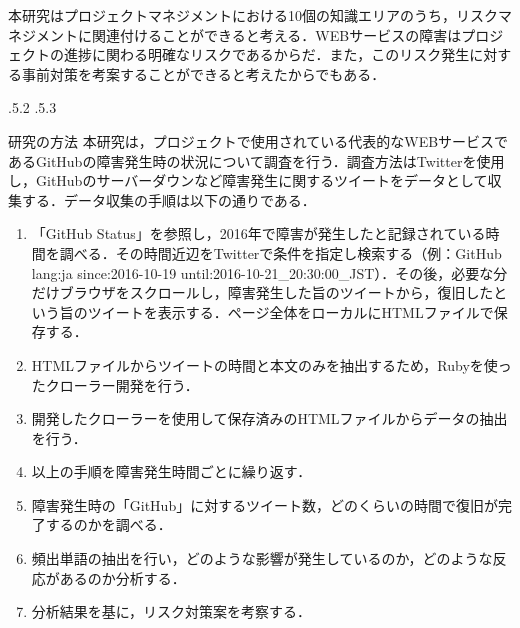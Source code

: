 \documentclass[uplatex]{jsarticle}
\makeatletter
\renewcommand{\section}{%
    \if@slide\clearpage\fi
    \@startsection{section}{1}{\z@}%
    {\Cvs \@plus.5\Cdp \@minus.2\Cdp}%
    {.5\Cvs \@plus.3\Cdp}%
    {\normalfont\raggedright}}
\makeatother
\begin{document}
本研究はプロジェクトマネジメントにおける10個の知識エリアのうち，リスクマネジメントに関連付けることができると考える．WEBサービスの障害はプロジェクトの進捗に関わる明確なリスクであるからだ．また，このリスク発生に対する事前対策を考案することができると考えたからでもある．

\section{研究の方法}
本研究は，プロジェクトで使用されている代表的なWEBサービスであるGitHubの障害発生時の状況について調査を行う．調査方法はTwitterを使用し，GitHubのサーバーダウンなど障害発生に関するツイートをデータとして収集する．データ収集の手順は以下の通りである\cite{03}．
\begin{enumerate}
 \item 「GitHub Status」を参照し，2016年で障害が発生したと記録されている時間を調べる．その時間近辺をTwitterで条件を指定し検索する（例：GitHub lang:ja since:2016-10-19 until:2016-10-21\_20:30:00\_JST）．その後，必要な分だけブラウザをスクロールし，障害発生した旨のツイートから，復旧したという旨のツイートを表示する．ページ全体をローカルにHTMLファイルで保存する．
 \item HTMLファイルからツイートの時間と本文のみを抽出するため，Rubyを使ったクローラー開発を行う\cite{04}．
 \item 開発したクローラーを使用して保存済みのHTMLファイルからデータの抽出を行う．
 \item 以上の手順を障害発生時間ごとに繰り返す．
 \item 障害発生時の「GitHub」に対するツイート数，どのくらいの時間で復旧が完了するのかを調べる．
 \item 頻出単語の抽出を行い，どのような影響が発生しているのか，どのような反応があるのか分析する．
 \item 分析結果を基に，リスク対策案を考察する．
\end{enumerate}
\end{document}
